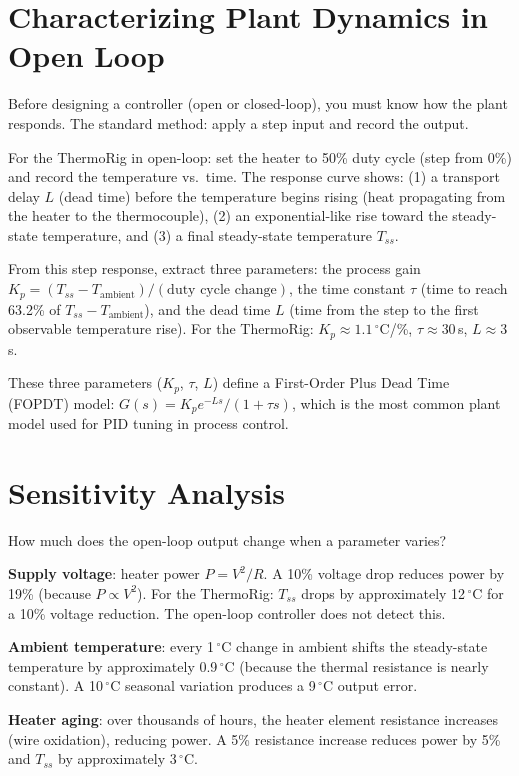 \documentclass[11pt,letterpaper,twoside,openany]{book}
\newcommand{\degC}{\ensuremath{{}^{\circ}\text{C}}}
\begin{document}
\section{Characterizing Plant Dynamics in Open Loop}
Before designing a controller (open or closed-loop), you must know how the plant responds. The standard method: apply a step input and record the output.

For the ThermoRig in open-loop: set the heater to 50\% duty cycle (step from 0\%) and record the temperature vs.\ time. The response curve shows: (1) a transport delay $L$ (dead time) before the temperature begins rising (heat propagating from the heater to the thermocouple), (2) an exponential-like rise toward the steady-state temperature, and (3) a final steady-state temperature $T_{ss}$.

From this step response, extract three parameters: the process gain $K_p = (T_{ss} - T_{\text{ambient}}) / (\text{duty cycle change})$, the time constant $\tau$ (time to reach 63.2\% of $T_{ss} - T_{\text{ambient}}$), and the dead time $L$ (time from the step to the first observable temperature rise). For the ThermoRig: $K_p \approx 1.1$\,\degC{}/\%, $\tau \approx 30$\,s, $L \approx 3$\,s.

These three parameters ($K_p$, $\tau$, $L$) define a First-Order Plus Dead Time (FOPDT) model: $G(s) = K_p e^{-Ls} / (1 + \tau s)$, which is the most common plant model used for PID tuning in process control.

\section{Sensitivity Analysis}
How much does the open-loop output change when a parameter varies?

\textbf{Supply voltage}: heater power $P = V^2/R$. A 10\% voltage drop reduces power by 19\% (because $P \propto V^2$). For the ThermoRig: $T_{ss}$ drops by approximately 12\,\degC{} for a 10\% voltage reduction. The open-loop controller does not detect this.

\textbf{Ambient temperature}: every 1\,\degC{} change in ambient shifts the steady-state temperature by approximately 0.9\,\degC{} (because the thermal resistance is nearly constant). A 10\,\degC{} seasonal variation produces a 9\,\degC{} output error.

\textbf{Heater aging}: over thousands of hours, the heater element resistance increases (wire oxidation), reducing power. A 5\% resistance increase reduces power by 5\% and $T_{ss}$ by approximately 3\,\degC{}.
\end{document}
